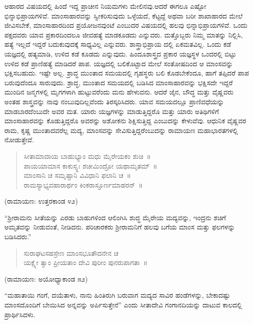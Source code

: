 ಆಹಾರದ ವಿಷಯದಲ್ಲಿ ಹಿಂದೆ ಇದ್ದ ಪ್ರಾಚೀನ ನಿಯಮಗಳು ಮೇಲಿನವು.ಆದರೆ ಈಗಲೂ ಎಷ್ಟೋ ಭಿನ್ನಾಭಿಪ್ರಾಯಗಳಿವೆ. ಮಾಂಸಾಹಾರವನ್ನು ಸ್ವೀಕರಿಸುವುದು ಒಳ್ಳೆಯದೆ, ಕೆಟ್ಟದ್ದೆ ಅಥವಾ ಬರೀ ಶಾಖಾಹಾರದ ಮೇಲೆ ಜೀವಿಸಬೇಕೆ, ಮಾಂಸಾಹಾರದಿಂದ ಪ್ರಯೋಜನವುಂಟೆ ಎಂಬುದರ ವಿಷಯದಲ್ಲಿ ಹಲವು ಭಿನ್ನಾಭಿಪ್ರಾಯಗಳಿವೆ. ಒಂದು ಪಕ್ಷದವರು ಯಾವ ಪ್ರಕಾರದಿಂದಲೂ ಜೀವಹತ್ಯೆ ಮಾಡಕೂಡದು ಎನ್ನುವರು. ಮತ್ತೊಬ್ಬರು ನಿಮ್ಮ ಮಾತನ್ನು ನಿಲ್ಲಿಸಿ, ಹತ್ಯೆ ಇಲ್ಲದೆ ಇದ್ದರೆ ಬದುಕುವುದಕ್ಕೆ ಸಾಧ್ಯವಿಲ್ಲ ಎನ್ನುವರು. ಶಾಸ್ತ್ರಾಭಿಪ್ರಾಯ ದಲ್ಲಿ ಏಕಮತವಿಲ್ಲ. ಒಂದು ಕಡೆ ಯಜ್ಞದಲ್ಲಿ ಹತ್ಯಮಾಡಿ, ಉಳಿದ ಕಡೆ ಕೂಡದು ಎನ್ನುವುದು. ಹಿಂದೂಶಾಸ್ತ್ರದ ಪ್ರಕಾರ ಯಜ್ಞಸ್ಥಳ ಒಂದರಲ್ಲಿ ಬಿಟ್ಟು ಉಳಿದ ಕಡೆ ಪ್ರಾಣಿಹತ್ಯೆ ಮಾಡಿದರೆ ಪಾಪ. ಯಜ್ಞದಲ್ಲಿ ಬಲಿಕೊಟ್ಟಾದ ಮೇಲೆ ಸಂತೋಷದಿಂದ ಆ ಮಾಂಸವನ್ನು ಭಕ್ಷಿಸಬಹುದು. ಇಷ್ಟೇ ಅಲ್ಲ. ಶ್ರಾದ್ಧ ಮುಂತಾದ ಸಮಯದಲ್ಲಿ ಗೃಹಸ್ಥರು ಬಲಿ ಕೊಡಬೇಕೆಂದೂ, ಹಾಗೆ ತಪ್ಪಿದರೆ ಪಾಪ ಬರುವುದೆಂದೂ ಸಾರುವುದು. ಶ್ರಾದ್ಧ, ಮುಂತಾದ ಸಮಯದಲ್ಲಿ ಬಡಿಸಿದ ಮಾಂಸಾಹಾರವನ್ನು ಭಕ್ಷಿಸದೇ ಇದ್ದರೆ ಮುಂದಿನ ಜನ್ಮಗಳಲ್ಲಿ ಮೃಗಗಳಾಗಿ ಹುಟ್ಟುವರೆಂದು ಮನು ಹೇಳುವನು. ಆದರೆ ಜೈನ, ಬೌದ್ಧ ಮತ್ತು ವೈಷ್ಣವರು ಅಂತಹ ಶಾಸ್ತ್ರವನ್ನು ನಾವು ನಂಬುವುದಿಲ್ಲವೆಂದು ತಿರಸ್ಕರಿಸಿದರು. ಯಾವ ಸಮಯದಲ್ಲೂ ಪ್ರಾಣಿವಧೆಯನ್ನು ಮಾಡಬಾರದೆಂಬುದೇ ಅವರ ಮತ. ಯಾರು ಯಜ್ಞಗಳನ್ನು ಮಾಡುತ್ತಿದ್ದರೊ ಮತ್ತು ಯಾರು ಅತಿಥಿಗಳಿಗೆ ಮಾಂಸಾಹಾರವನ್ನು ಕೊಡುತ್ತಿದ್ದರೊ ಅವರನ್ನು ಅಶೋಕನು ಶಿಕ್ಷಿಸುತ್ತಿದ್ದ ಎಂಬುದನ್ನು ಕೇಳುವೆವು. ಆಧುನಿಕ ವೈಷ್ಣವರ ರಾಮ, ಕೃಷ್ಣ ಮುಂತಾದವರೆಲ್ಲ ಮದ್ಯ, ಮಾಂಸವನ್ನು ಸೇವಿಸುತ್ತಿದ್ದರೆಂಬುದನ್ನು ರಾಮಾಯಣ ಮಹಾಭಾರತಗಳಲ್ಲಿ ನೋಡುತ್ತೇವೆ.

\begin{verse}
ಸೀತಾಮಾದಾಯ ಬಾಹುಭ್ಯಾಂ ಮಧು ಮೈರೇಯಕಂ ಶುಚಿ~॥\\ಪಾಯಯಾಮಾಸ ಕಾಕುಸ್ಸ್ಥಃ ಶಚೀಮಿಂದ್ರೋ ಯಥಾಮೃತಮ್​~॥\\ಮಾಂಸಾನಿ ಚ ಸಮೃಷ್ಟಾನಿ ವಿವಿಧಾನಿ ಫಲಾನಿ ಚ~॥\\ರಾಮಸ್ಯಾಭ್ಯವಹಾರಾರ್ಥಂ ಕಿಂಕರಾಸ್ತೂರ್ಣಮಾಹರನ್​~॥
\end{verse}

\begin{flushright}
(ರಾಮಾಯಣ: ಉತ್ತರಕಾಂಡ ೪೨)
\end{flushright}

“ಶ‍್ರೀರಾಮನು ಸೀತೆಯನ್ನು ಎರಡು ಬಾಹುಗಳಿಂದ ಆಲಿಂಗಿಸಿ ಶುದ್ಧ ಮೈರೇಯ ಮದ್ಯವನ್ನು, ಇಂದ್ರನು ಶಚಿಗೆ ಅಮೃತವನ್ನು ನೀಡುವಂತೆ, ನೀಡಿದನು. ಪರಿಚಾರಕರು ಶ‍್ರೀರಾಮನಿಗೆ ಹಲವು ಬಗೆಯ ಮಾಂಸ ಮತ್ತು ಫಲಗಳನ್ನು ಬಡಿಸಿದರು.”

\begin{verse}
ಸುರಾಘಟಸಹಸ್ರೇಣ ಮಾಂಸಭೂತೌದನೇನ ಚ\\ಯಕ್ಷ್ಯೇ ತ್ವಾಂ ಪ್ರೀಯತಾಂ ದೇವಿ ಪುರೀಂ ಪುನರುಪಾಗತಾ~॥
\end{verse}

\begin{flushright}
(ರಾಮಾಯಣ: ಅಯೋಧ್ಯಾಕಾಂಡ ೫೨)
\end{flushright}

“ಮಹಾತಾಯಿ ಗಂಗೆ, ದಯೆತಾಳು, ನಾನು ಹಿಂತಿರುಗಿ ಬರುವಾಗ ಮದ್ಯದ ಸಾವಿರ ಹಂಡೆಗಳನ್ನು, ಬೇಕಾದಷ್ಟು ಮಾಂಸದೊಂದಿಗೆ ಬೇಯಿಸಿದ ಅನ್ನವನ್ನು ಅರ್ಪಿಸುತ್ತೇನೆ” ಎಂದು ಸೀತಾದೇವಿ ಗಂಗಾನದಿಯನ್ನು ದಾಟುವ ಕಾಲದಲ್ಲಿ ಪ್ರಾರ್ಥಿಸಿದಳು.

